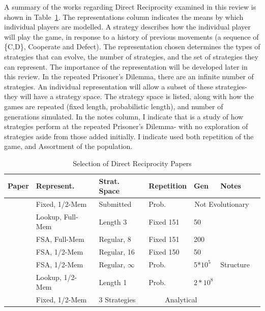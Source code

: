\documentclass[a4paper,11pt]{article}
\begin{document}
A summary of the works regarding Direct Reciprocity examined in this review is shown in Table~\ref{table:papers}. 
The representations column indicates the means by which individual players are modelled.  A strategy describes how the individual player will play the game, in response to a history of previous movements (a sequence of \{C,D\}, Cooperate and Defect). 
The representation chosen determines the types of strategies that can evolve, the number of strategies, and the set of strategies they can represent. The importance of the representation will be developed later in this review. 
In the repeated Prisoner's Dilemma, there are an infinite number of strategies. 
An individual representation will allow a subset of these strategies- they will have a strategy space. 
The strategy space is listed, along with how the games are repeated (fixed length, probabilistic length), and number of generations simulated. 
In the notes column, I indicate that \citet{axelrod:Science:1981} is a study of how strategies perform at the repeated Prisoner's Dilemma- with no exploration of strategies aside from those added initially. I indicate \citet{van-veelen:PNAS:2012} used both repetition of the game, and Assortment of the population. 

\begin{table}[h!]\small\centering
\captionsetup{justification=centering}
\begin{tabular}{|p{3.5cm}|l|l|l|l|l|l|}
\hline
\textbf{Paper} & \textbf{Represent.} & \textbf{Strat. Space} & \textbf{Repetition} & \textbf{Gen} & \textbf{Notes}\\
\hline
\citet{axelrod:Science:1981}&Fixed, 1/2-Mem &Submitted &Prob. & \multicolumn{2}{c|}{Not Evolutionary}\\
\hline
{\citet{axelrod1987evolution}}&Lookup, Full-Mem & Length 3 & Fixed 151& 50&\\
\hline
\cite{fogel1993evolving}&FSA, Full-Mem &Regular, 8 & Fixed 151& 200&\\
\hline
\cite{miller1996coevolution}&FSA, 1/2-Mem & Regular, 16 & Fixed 150&50 &\\
\hline
\citet{van-veelen:PNAS:2012}&FSA, 1/2-Mem &Regular, $\infty$ &Prob. &5*$10^5$ &Structure\\
\hline
\citet{garcia:PLoSOne:2012}& Lookup, 1/2-Mem& Length 1& Prob.& $2*10^8$&\\
\hline
\cite{imhof:PNAS:2005}&Fixed, 1/2-Mem & 3 Strategies& \multicolumn{2}{c}{Analytical}&\\
\hline
\end{tabular}
\caption{Selection of Direct Reciprocity Papers}
\label{table:papers}
\end{table}
\end{document}
